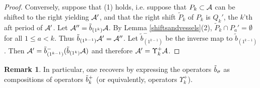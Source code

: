 \documentclass[12pt]{amsart}
\numberwithin{equation}{section}
\theoremstyle{definition}
\newtheorem{remark}[equation]{Remark}
\newcommand{\emp}{\emptyset}
\newcommand{\slinf}{\mathfrak{sl}_\infty}
\begin{document}
\begin{proof}
Conversely, suppose that (1) holds, i.e. suppose that $P_k\subset\mathcal{A}$ can be shifted to the right yielding $\mathcal{A}'$, and that the right shift $\tilde{P}_k$ of $P_k$ is $Q_k'$, the $k$'th aft period of $\mathcal{A}'$. Let $\mathcal{A}''=\tilde{b}_{(1^k)}\mathcal{A}$. By Lemma \ref{shiftsandvessels}(2), $\tilde{P}_k\cap P_a'=\emp$ for all $1\leq a<k$. Thus $\tilde{b}_{(1^{k-1})}\mathcal{A}'=\mathcal{A}''$. Let $\tilde{b}_{(1^{k-1})}^-$ be the inverse map to $\tilde{b}_{(1^{k-1})}$. Then $\mathcal{A}'=\tilde{b}_{(1^{k-1})}^-(\tilde{b}_{(1^k)}\mathcal{A})$ and therefore $\mathcal{A}'=\Upsilon_k^+\mathcal{A}$.
\begin{comment}
In order to show that there is an arrow $\cA\rightarrow\cA'$ in the $\slinf$-crystal, it suffices to show that $\theta$ has an addable box in row $k$ where $\theta$ is the partition such that $\cA=\tilde{b}_\theta\cA^\circ$. 
Apply a sequence $\tilde{b}^-$ of operators $\Upsilon_m^-$ for $m\neq k$ to $\cA'$ until an abacus $\cA''$ is obtained such that for any $m\neq k$, $\Upsilon_m^-\cA''=0$. Then $\cA''=\tilde{b}_\rho\cA'^\circ$ where $\cA'^\circ$ is the highest weight vertex of the crystal component of $\cA'$, and $\rho$ is either $\emp$ or a rectangular partition with $k$ rows. %
Now consider $\tilde{b}^-\cA$. Then either $\cA''=\Upsilon_k^+\tilde{b}^-\cA$, or $\cA''$ is a highest weight vertex for the $\slinf$ crystal, because $Q_k'\cap P_a'=\emp$ for all $a\neq k$ by Lemma \ref{shiftsandvessels}(2) and so $Q_k'$ is also the $k$'th aft period of $\cA''$ whose left shift is the $k$'th fore period of $\tilde{b}^-\cA$. Also, $\cA'=\Upsilon_k^+\cA$ if and only if $\cA''=\Upsilon_k\tilde{b}^-\cA$. Let us argue that $\cA''$ is not a highest weight vertex for the $\slinf$-crystal. Consider the number $r$ of times that $Q_k''=Q_k'\in\cA''$ can be shifted recursively to the left in such a way that its shift is the $k$'th fore period of the resulting abacus. We know that $r\geq1$. After shifting $Q_k''$ recursively to the left $r$ times, and then shifting $Q_{r-1}''$ recursively $r$ times to the left, and then $Q_{r-2}''$, and so on until no aft period can be shifted to the left, the resulting abacus $\cB$ is certainly a highest weight vertex for the $\slinf$-crystal because it contains no left-shiftable aft periods. But then applying $\tilde{b}_{(r^k)}$ to $\cB$ recovers $\cA''$. This concludes the proof.
\end{comment}
\end{proof}

\begin{remark}
In particular, one recovers \cite[Theorem 5.11]{Gerber2016a} by expressing the operators ${\tilde{b}}_\sigma$ as compositions of operators ${\tilde{b}}^+_k$ (or equivalently, operators $\Upsilon^+_k$).
\end{remark}
\end{document}
